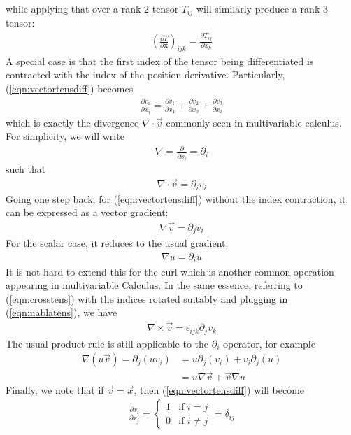 while applying that over a rank-$2$ tensor $T_{ij}$ will similarly produce a rank-$3$ tensor:
\begin{align}
\left(\frac{\partial T}{\partial \textbf{x}}\right)_{ijk} = \frac{\partial T_{ij}}{\partial x_k}
\end{align}
A special case is that the first index of the tensor being differentiated is contracted with the index of the position derivative. Particularly, (\ref{eqn:vectortensdiff}) becomes
\begin{align}
\frac{\partial v_i}{\partial x_i} = \frac{\partial v_1}{\partial x_1} + \frac{\partial v_2}{\partial x_2} + \frac{\partial v_3}{\partial x_3}
\end{align}
which is exactly the divergence $\nabla \cdot \vec{v}$ commonly seen in multivariable calculus. For simplicity, we will write 
\begin{align}
\nabla = \frac{\partial}{\partial x_i} = \partial_i \label{eqn:nablatens}
\end{align}
such that
\begin{align}
\nabla \cdot \vec{v} = \partial_i v_i
\end{align}
Going one step back, for (\ref{eqn:vectortensdiff}) without the index contraction, it can be expressed as a vector gradient:
\begin{align}
\nabla \vec{v} = \partial_j v_i
\end{align}
For the scalar case, it reduces to the usual gradient:
\begin{align}
\nabla u = \partial_i u
\end{align}
It is not hard to extend this for the curl which is another common operation appearing in multivariable Calculus. In the same essence, referring to (\ref{eqn:crosstens}) with the indices rotated suitably and plugging in (\ref{eqn:nablatens}), we have
\begin{align}
\nabla \times \vec{v} = \epsilon_{ijk} \partial_j v_k \label{eqn:curltens}
\end{align}
The usual product rule is still applicable to the $\partial_i$ operator, for example
\begin{align*}
\nabla(u\vec{v}) = \partial_j(uv_i) &= u\partial_j(v_i) + v_i\partial_j(u) \\
&= u \nabla \vec{v} + \vec{v}\nabla u
\end{align*}
Finally, we note that if $\vec{v} = \vec{x}$, then (\ref{eqn:vectortensdiff}) will become
\begin{align}
\frac{\partial x_i}{\partial x_j} = \begin{cases}
1 & \text{if $i=j$} \\
0 & \text{if $i\neq j$}
\end{cases} = \delta_{ij}
\label{eqn:dxdxdelta}
\end{align}
